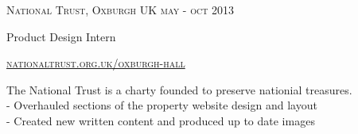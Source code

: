 {
    \textsc{\small{National Trust, Oxburgh UK
        \hfill
            {\raggedleft
                may - oct 2013
            } \\
        }
    }
    {\raggedright\large {
        Product Design Intern
    } \\}

    \textsc{\small\href{http://www.nationaltrust.org.uk/oxburgh-hall}{nationaltrust.org.uk/oxburgh-hall}}

    \normalsize{
        The National Trust is a charty founded to preserve nationial treasures.\\
        - Overhauled sections of the property website design and layout \\
        - Created new written content and produced up to date images
    }
}
